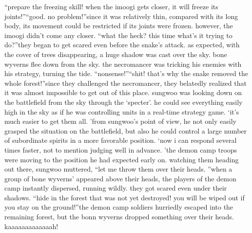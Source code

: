 “prepare the freezing skill! when the imoogi gets closer, it will freeze its joints!”“good.
 no problem!”since it was relatively thin, compared with its long body, its movement could be restricted if its joints were frozen.
however, the imoogi didn’t come any closer.
“what the heck? this time what’s it trying to do?”they began to get scared even before the snake’s attack.
as expected, with the cover of trees disappearing, a huge shadow was cast over the sky.
bone wyverns flee down from the sky.
the necromancer was tricking his enemies with his strategy, turning the tide.
“nonsense!”“shit! that’s why the snake removed the whole forest!”since they challenged the necromancer, they belatedly realized that it was almost impossible to get out of this place.
sungwoo was looking down on the battlefield from the sky through the ‘specter’.
he could see everything easily high in the sky as if he was controlling units in a real-time strategy game.
‘it’s much easier to get them all.
’from sungwoo’s point of view, he not only easily grasped the situation on the battlefield, but also he could control a large number of subordinate spirits in a more favorable position.
‘now i can respond several times faster, not to mention judging well in advance.
’the demon camp troops were moving to the position he had expected early on.
watching them heading out there, sungwoo muttered, “let me throw them over their heads.
”when a group of bone wyverns’ appeared above their heads, the players of the demon camp instantly dispersed, running wildly.
 they got scared even under their shadows.
“hide in the forest that was not yet destroyed! you will be wiped out if you stay on the ground!”the demon camp soldiers hurriedly escaped into the remaining forest, but the bonn wyverns dropped something over their heads.
kaaaaaaaaaaaaah!

 